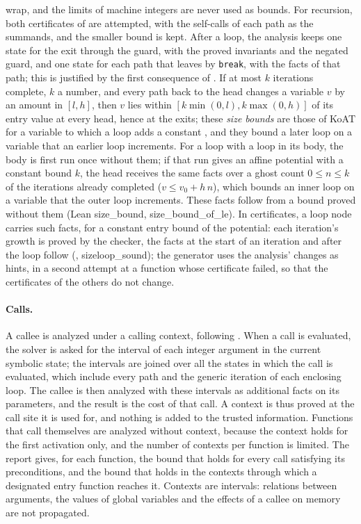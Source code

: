 \documentclass[oneside,english]{amsart}
\numberwithin{equation}{section}
\numberwithin{figure}{section}
\theoremstyle{plain}
\theoremstyle{definition}
\theoremstyle{plain}
\theoremstyle{remark}
\theoremstyle{plain}
\theoremstyle{definition}
\theoremstyle{plain}
\theoremstyle{remark}
\newcommand{\lean}[1]{{\ttfamily\small #1}}
\begin{document}
wrap, and the limits of machine integers are never used as bounds. For recursion, both certificates of \cite[Proposition~\ref{I-prop:size-potential}]{crosscheckTheory} are attempted, with the self-calls of each path as the summands, and the smaller bound is kept. After a loop, the analysis keeps one state for the exit through the guard, with the proved invariants and the negated guard, and one state for each path that leaves by \texttt{break}, with the facts of that path; this is justified by the first consequence of \cite[Proposition~\ref{I-prop:context-bound}]{crosscheckTheory}. If at most $k$ iterations complete, $k$ a number, and every path back to the head changes a variable $v$ by an amount in $[l, h]$, then $v$ lies within $[k \min(0, l), k \max(0, h)]$ of its entry value at every head, hence at the exits; these \emph{size bounds} are those of KoAT for a variable to which a loop adds a constant \cite[Section~4.2]{brockschmidt2016analyzing}, and they bound a later loop on a variable that an earlier loop increments. For a loop with a loop in its body, the body is first run once without them; if that run gives an affine potential with a constant bound $k$, the head receives the same facts over a ghost count $0 \le n \le k$ of the iterations already completed ($v \le v_0 + h\,n$), which bounds an inner loop on a variable that the outer loop increments. These facts follow from a bound proved without them (Lean \lean{size\_bound}, \lean{size\_bound\_of\_le}). In certificates, a loop node carries such facts, for a constant entry bound of the potential: each iteration's growth is proved by the checker, the facts at the start of an iteration and after the loop follow (\cite[Proposition~\ref{I-prop:size-facts}]{crosscheckTheory}, \lean{sizeloop\_\allowbreak sound}); the generator uses the analysis' changes as hints, in a second attempt at a function whose certificate failed, so that the certificates of the others do not change.

\paragraph{Calls.}
A callee is analyzed under a calling context, following \cite[Proposition~\ref{I-prop:context-bound}]{crosscheckTheory}. When a call is evaluated, the solver is asked for the interval of each integer argument in the current symbolic state; the intervals are joined over all the states in which the call is evaluated, which include every path and the generic iteration of each enclosing loop. The callee is then analyzed with these intervals as additional facts on its parameters, and the result is the cost of that call. A context is thus proved at the call site it is used for, and nothing is added to the trusted information. Functions that call themselves are analyzed without context, because the context holds for the first activation only, and the number of contexts per function is limited. The report gives, for each function, the bound that holds for every call satisfying its preconditions, and the bound that holds in the contexts through which a designated entry function reaches it. Contexts are intervals: relations between arguments, the values of global variables and the effects of a callee on memory are not propagated.
\end{document}
